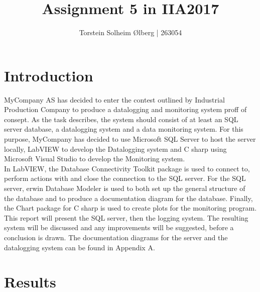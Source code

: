 \documentclass[11pt, A4paper, english]{article}
\author{Torstein Solheim Ølberg | 263054}
\title{Assignment 5 in IIA2017}
\begin{document}
\maketitle
\clearpage

\tableofcontents
\clearpage

	\section{Introduction}
MyCompany AS has decided to enter the contest \cite{task} outlined by Industrial Production Company to produce a datalogging and monitoring system proff of consept. As the task describes, the system should consist of at least an SQL server database, a datalogging system and a data monitoring system. For this purpose, MyCompany has decided to use Microsoft SQL Server to host the server locally, LabVIEW to develop the Datalogging system and C sharp using Microsoft Visual Studio to develop the Monitoring system. \\
In LabVIEW, the Database Connectivity Toolkit package \cite{NIDB} is used to connect to, perform actions with and close the connection to the SQL server. For the SQL server, erwin Database Modeler \cite{erwin} is used to both set up the general structure of the database and to produce a documentation diagram for the database. Finally, the Chart package for C sharp is used to create plots for the monitoring program. \\
This report will present the SQL server, then the logging system. The resulting system will be discussed and any improvements will be suggested, before a conclusion is drawn. The documentation diagrams for the server and the datalogging system can be found in Appendix A.

	\section{Results}
\end{document}
